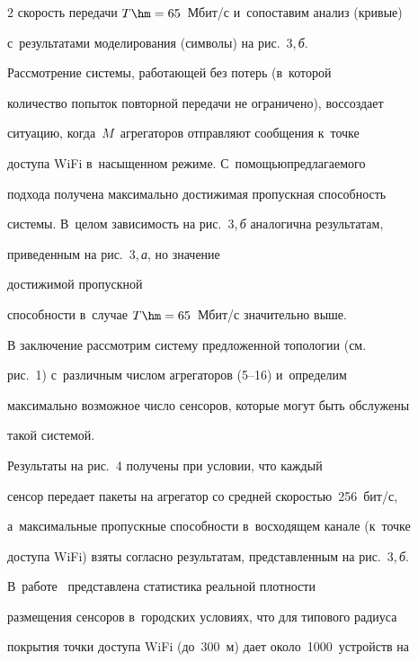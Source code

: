 \begin{multicols}{2}
скорость передачи $T\hm=65$~Мбит/с и~сопоставим анализ (кривые) 


с~результатами моделирования (символы) на рис.~3,\,\textit{б}.





    


    Рассмотрение системы, работающей без потерь (в~которой 


количество попыток повторной передачи не ограничено), воссоздает 


ситуацию, когда~$M$~агрегаторов отправляют сообщения к~точке 


доступа WiFi в~насыщенном режиме. С~по\-мощью\linebreak предлагаемого 


подхода получена максимально достижимая пропускная способность 


сис\-те\-мы. В~целом зависимость на рис.~3,\,\textit{б} аналогична результатам, 


приведенным на рис.~3,\,\textit{а}, но значение\linebreak 


достижимой пропускной 


способности в~случае $T\hm=65$~Мбит/с значительно выше. 


    


    В заключение рассмотрим систему предложенной топологии (см.\ 


рис.~1) с~различным числом агрегаторов (5--16) и~определим 


максимально возможное число сенсоров, которые могут быть обслужены 


такой системой.


 


Результаты на рис.~4 получены при условии, что каждый 


сенсор передает пакеты на агрегатор со средней скоростью~256~бит/с, 


а~максимальные пропускные способности в~восходящем канале (к~точке 


доступа WiFi) взяты согласно результатам, пред\-став\-лен\-ным на рис.~3,\,\textit{б}. 


В~работе~\cite{12-om} пред\-став\-ле\-на статистика реальной плот\-ности 


размещения сенсоров в~городских условиях, что для типового радиуса 


покрытия точки доступа WiFi (до~300~м) дает около~1000~устройств на 



\end{multicols}
